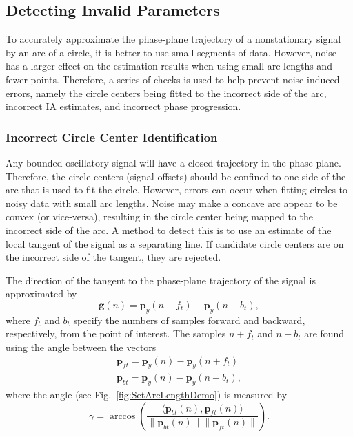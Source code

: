\documentclass[11pt,draftcls,onecolumn]{IEEEtran}
\begin{document}
\subsection{Detecting Invalid Parameters}\label{sect:DetectingInvalidParameters}
To accurately approximate the phase-plane trajectory of a nonstationary signal by an arc of a circle, it is better to use small segments of data. However, noise has a larger effect on the estimation results when using small arc lengths and fewer points. Therefore, a series of checks is used to help prevent noise induced errors, namely the circle centers being fitted to the incorrect side of the arc, incorrect IA estimates, and incorrect phase progression. 

\subsubsection{Incorrect Circle Center Identification}
Any bounded oscillatory signal will have a closed trajectory in the phase-plane. Therefore, the circle centers (signal offsets) should be confined to one side of the arc that is used to fit the circle. However, errors can occur when fitting circles to noisy data with small arc lengths. Noise may make a concave arc appear to be convex (or vice-versa), resulting in the circle center being mapped to the incorrect side of the arc. A method to detect this is to use an estimate of the local tangent of the signal as a separating line. If candidate circle centers are on the incorrect side of the tangent, they are rejected. 

The direction of the tangent to the phase-plane trajectory of the signal is approximated by 
\begin{equation}
	\mathbf{g}(n) = \mathbf{p}_y(n + f_t) - \mathbf{p}_y(n - b_t),
\end{equation}
where $f_t$ and $b_t$ specify the numbers of samples forward and backward, respectively, from the point of interest. The samples $n + f_t$ and $n-b_t$ are found using the angle between the vectors
\begin{align}
	\mathbf{p}_{ft} = \mathbf{p}_y(n) - \mathbf{p}_y(n + f_t) \\
	\mathbf{p}_{bt} = \mathbf{p}_y(n) - \mathbf{p}_y(n - b_t),
\end{align}
where the angle (see Fig.~\ref{fig:SetArcLengthDemo}) is measured by
\begin{equation}\label{eq:TangentArcLength}
	\gamma = \arccos\left(\frac{\langle\mathbf{p}_{bt}(n),\mathbf{p}_{ft}(n)\rangle}{\|\mathbf{p}_{bt}(n)\| \|\mathbf{p}_{ft}(n)\|}\right).
\end{equation}
\end{document}
